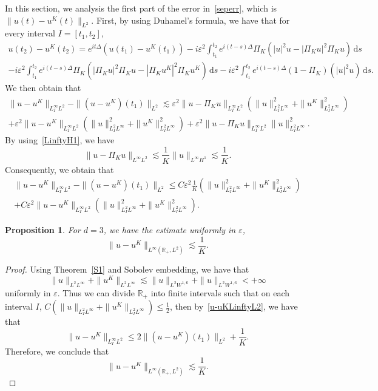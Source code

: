 \documentclass[10pt,a4paper]{article}
\newtheorem{proposition}[theorem]{Proposition}
\begin{document}
  In this section, we analysis the first part of the error in~\eqref{seperr}, which
  is \(\|u(t)-u^K(t)\|_{L^2}\). First, by using Duhamel's formula, we have
  that for every interval \(I = [t_1 , t_2]\),
  \begin{multline}
    u(t_2) - u^K(t_2) = e^{it\Delta}(u(t_1) - u^K(t_1))  
    - i \varepsilon^2 \int_{t_1}^{t_2} e^{i(t-s)\Delta} \Pi_K (|u|^2u 
    - |\Pi_K u|^2\Pi_K u) \,\mathrm{d}s \\ 
    - i \varepsilon^2 \int_{t_1}^{t_2} e^{i(t-s)\Delta} \Pi_K (|\Pi_K u|^2\Pi_K u 
    - |\Pi_K u^K|^2\Pi_K u^K) \,\mathrm{d}s  
    - i \varepsilon^2 \int_{t_1}^{t_2} e^{i(t-s)\Delta} (1 - \Pi_K)(|u|^2u) 
    \,\mathrm{d}s .
  \end{multline}
  We then obtain that
  \begin{multline}
    \|u-u^K\|_{L^{\infty}_{I}L^2} - \|(u-u^K)(t_1)\|_{L^2} \lesssim
    \varepsilon^2 \| u - \Pi_K u \|_{L^{\infty}_{I}L^2} ( \|u\|^2_{L^2_{I}L^{\infty}} + 
    \|u^K\|^2_{L^2_{I}L^{\infty}} ) \\
    + \varepsilon^2 \| u - u^K \|_{L^{\infty}_{I}L^2} ( \|u\|^2_{L^2_{I}L^{\infty}} + 
    \|u^K\|^2_{L^2_{I}L^{\infty}} ) + \varepsilon^2 \| u - \Pi_K u \|_{L^{\infty}_{I}L^2} 
    \|u\|^2_{L^2_{I}L^{\infty}}.
  \end{multline}
  By using~\eqref{LinftyH1}, we have 
  \[ \|u-\Pi_K u\|_{L^\infty L^2} \lesssim \frac1K \|u\|_{L^\infty H^1} \lesssim
  \frac1K. \]
  Consequently, we obtain that 
  \begin{multline}\label{u-uKLinftyL2}
    \|u-u^K\|_{L^\infty_I L^2} - \|(u-u^K)(t_1)\|_{L^2} \leq C
    \varepsilon^2 \frac1K (\|u\|^2_{L^2_I L^\infty} + 
    \|u^K\|^2_{L^2_I L^\infty} ) \\
    + C \varepsilon^2 \| u - u^K \|_{L^\infty_I L^2} ( \|u\|^2_{L^2_I L^\infty} + 
    \|u^K\|^2_{L^2_I L^\infty} ).
  \end{multline}


  \begin{proposition}\label{u-uKLinftyL2d3}
    For \(d=3\), we have the estimate uniformly in \(\varepsilon\),
    \begin{equation}
      \|u-u^K\|_{L^\infty({\mathbb R_+},L^2)} \lesssim \frac1K.
    \end{equation}
  \end{proposition}

  \begin{proof}
    Using Theorem~\ref{S1} and Sobolev embedding, we have that 
    \[ \|u\|_{L^2L^\infty}+\|u^K\|_{L^2L^\infty} \lesssim \|u\|_{L^2W^{1,6}} +
    \|u\|_{L^2W^{1,6}} < +\infty \]
    uniformly in \(\varepsilon\). Thus we can divide \(\mathbb R_+\) into finite 
    intervals such that on each interval \(I\), \(C (\|u\|_{L^2_I L^\infty} + 
    \|u^K\|_{L^2_I L^\infty}) \leq \frac12\), then by~\eqref{u-uKLinftyL2}, we
    have that 
    \[ \|u-u^K\|_{L^\infty_I L^2} \leq 2\|(u-u^K)(t_1)\|_{L^2} + \frac1K. \]
    Therefore, we conclude that 
    \[ \|u-u^K\|_{L^\infty({\mathbb R_+},L^2)} \lesssim \frac1K. \]
  \end{proof}
\end{document}
